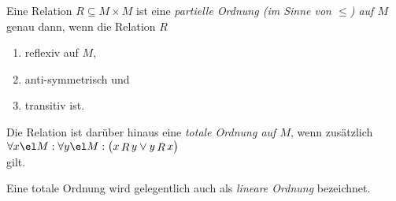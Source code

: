 \begin{Definition}
  Eine Relation $R \subseteq M \times M$  ist eine 
  \emph{partielle Ordnung (im Sinne von $\leq$) auf $M$} genau dann, wenn die Relation $R$
  \begin{enumerate}
  \item reflexiv auf $M$,
  \item anti-symmetrisch und
  \item transitiv ist.
  \end{enumerate}
  Die Relation ist dar\"{u}ber hinaus eine \emph{totale Ordnung auf $M$}, wenn zus\"{a}tzlich
  \\[0.2cm]
  \hspace*{1.3cm} $\forall x \el M : \forall y \el M :\bigl( x\mathop{R}y \vee y \mathop{R} x\bigr)$
  \\[0.2cm]
  gilt. \eox
\end{Definition}

\remark
Eine totale Ordnung wird gelegentlich auch als \emph{lineare Ordnung} bezeichnet. \eox

